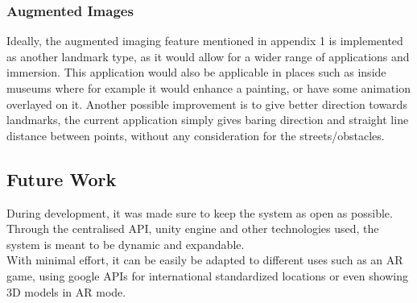 \subsubsection{Augmented Images}
Ideally, the augmented imaging feature mentioned in appendix 1 is implemented as another landmark type, as it would allow for a wider range of applications and immersion.
This application would also be applicable in places such as inside museums where for example it would enhance a painting, or have some animation overlayed on it.
\noindent
Another possible improvement is to give better direction towards landmarks, the current application simply gives baring direction and straight line distance between points,
 without any consideration for the streets/obstacles.
\subsection{Future Work}
During development, it was made sure to keep the system as open as possible. Through the 
centralised API, unity engine and other technologies used, the system is meant to be dynamic and 
expandable.\\
With minimal effort, it can be easily be adapted to different uses such as an AR game, 
using google APIs for international standardized locations or even showing 3D models in AR mode. 


